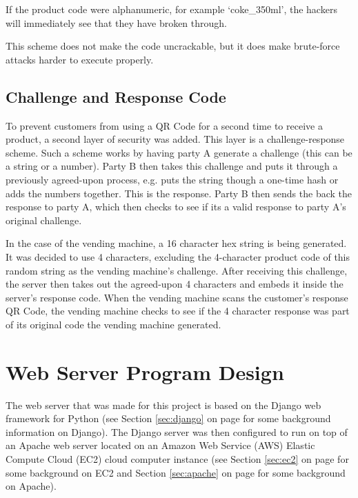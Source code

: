 If the product code were alphanumeric, for example `coke\_350ml', the hackers
will immediately see that they have broken through.

This scheme does not make the code uncrackable, but it does make brute-force
attacks harder to execute properly.

\subsection{Challenge and Response Code}
\label{sec:challenge-response}

To prevent customers from using a QR Code for a second time to receive a
product, a second layer of security was added. This layer is a
challenge-response scheme. Such a scheme works by having party A generate a
challenge (this can be a string or a number). Party B then takes this challenge
and puts it through a previously agreed-upon process, e.g. puts the string
though a one-time hash or adds the numbers together. This is the response.
Party B then sends the back the response to party A, which then checks to see
if its a valid response to party A's original challenge.

In the case of the vending machine, a 16 character hex string is being
generated. It was decided to use 4 characters, excluding the 4-character product
code of this random string as the vending machine's challenge. After receiving
this challenge, the server then takes out the agreed-upon 4 characters and
embeds it inside the server's response code. When the vending machine
scans the customer's response QR Code, the vending machine checks to see if the
4 character response was part of its original code the vending machine generated.

\section{Web Server Program Design}

The web server that was made for this project is based on the Django web framework for Python
(see Section \ref{sec:django} on page \pageref{sec:django} for some background
information on Django). The Django server was then configured to run on top of
an Apache web server located on an Amazon Web Service (AWS) Elastic Compute
Cloud (EC2) cloud computer instance (see Section \ref{sec:ec2} on page
\pageref{sec:ec2} for some background on EC2 and Section \ref{sec:apache} on
page \pageref{sec:apache} for some background on Apache).

